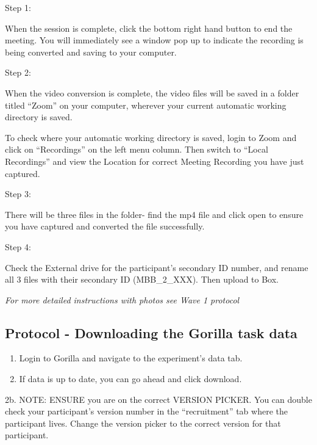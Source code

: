 \documentclass[]{book}
\begin{document}
Step 1:

When the session is complete, click the bottom right hand button to end the meeting. You will immediately see a window pop up to indicate the recording is being converted and saving to your computer.

Step 2:

When the video conversion is complete, the video files will be saved in a folder titled ``Zoom'' on your computer, wherever your current automatic working directory is saved.

To check where your automatic working directory is saved, login to Zoom and click on ``Recordings'' on the left menu column. Then switch to ``Local Recordings'' and view the Location for correct Meeting Recording you have just captured.

Step 3:

There will be three files in the folder- find the mp4 file and click open to ensure you have captured and converted the file successfully.

Step 4:

Check the External drive for the participant's secondary ID number, and rename all 3 files with their secondary ID (MBB\_2\_XXX). Then upload to Box.

\emph{For more detailed instructions with photos see Wave 1 protocol}

\hypertarget{protocol---downloading-the-gorilla-task-data-1}{%
\subsection{Protocol - Downloading the Gorilla task data}\label{protocol---downloading-the-gorilla-task-data-1}}

\begin{enumerate}
\def\labelenumi{\arabic{enumi}.}
\item
  Login to Gorilla and navigate to the experiment's data tab.
\item
  If data is up to date, you can go ahead and click download.
\end{enumerate}

2b. NOTE: ENSURE you are on the correct VERSION PICKER. You can double check your participant's version number in the ``recruitment'' tab where the participant lives. Change the version picker to the correct version for that participant.
\end{document}
